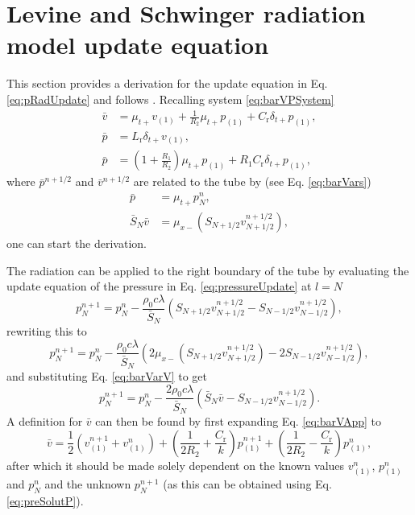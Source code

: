 \section{Levine and Schwinger radiation model update equation}\label{app:levineSchwingDeriv}
\def\r{\text{r}}
\def\one{{(1)}}
This section provides a derivation for the update equation in Eq. \eqref{eq:pRadUpdate} and follows \cite[Sec. 4.1.3, pp. 109--111]{Harrison2018}. Recalling system \eqref{eq:barVPSystem}
\begin{subequations}\label{eq:barVPSystemApp}
    \begin{align}
        \bar v &= \mu_{t+}v_\one + \frac{1}{R_2}\mu_{t+}p_\one + C_\r \delta_{t+}p_\one,\label{eq:barVApp}\\
        \bar p &= L_\r \delta_{t+}v_\one,\label{eq:barP1App}\\
        \bar p &= \left(1+\frac{R_1}{R_2}\right)\mu_{t+}p_\one+ R_1 C_\r\delta_{t+}p_\one\label{eq:barP2App},
    \end{align}
\end{subequations}
where $\bar p^{n+1/2}$ and $\bar v^{n+1/2}$ are related to the tube by (see Eq. \eqref{eq:barVars})
\begin{align}
    \bar p &= \mu_{t+}p^n_N,\label{eq:barVarP}\\
    \bar S_N \bar v &= \mu_{x-}\left(S_{N+1/2}v_{N+1/2}^{n+1/2}\right),\label{eq:barVarV}
\end{align}
one can start the derivation. 

The radiation can be applied to the right boundary of the tube by evaluating the update equation of the pressure in Eq. \eqref{eq:pressureUpdate} at $l = N$
\begin{equation}
    p_N^{n+1} = p_N^n - \frac{\rho_0 c \lambda}{\bar{S}_N}\left(S_{N+1/2}v_{N+1/2}^{n+1/2}-S_{N-1/2}v_{N-1/2}^{n+1/2}\right),
\end{equation}
rewriting this to 
\begin{equation*}
    p_N^{n+1} = p_N^n - \frac{\rho_0 c \lambda}{\bar{S}_N}\left(2\mu_{x-}\left(S_{N+1/2}v_{N+1/2}^{n+1/2}\right)-2S_{N-1/2}v_{N-1/2}^{n+1/2}\right),
\end{equation*}
and substituting Eq. \eqref{eq:barVarV} to get
\begin{equation}
    p_N^{n+1} = p_N^n - \frac{2\rho_0 c \lambda}{\bar{S}_N}\left(\bar S_N \bar v-S_{N-1/2}v_{N-1/2}^{n+1/2}\right)\label{eq:preSolutP}.
\end{equation}
A definition for $\bar v$ can then be found by first expanding Eq. \eqref{eq:barVApp} to 
\begin{equation}\label{eq:vBarExpanded}
    \bar v = \frac{1}{2}\left(v_\one^{n+1} + v_\one^n\right) + \left(\frac{1}{2R_2} + \frac{C_\r}{k}\right) p_\one^{n+1} +\left(\frac{1}{2R_2} - \frac{C_\r}{k}\right)p_\one^n,
\end{equation}
after which it should be made solely dependent on the known values $v_\one^n$, $p_\one^n$ and $p_N^n$ and the unknown $p_N^{n+1}$ (as this can be obtained using Eq. \eqref{eq:preSolutP}).

